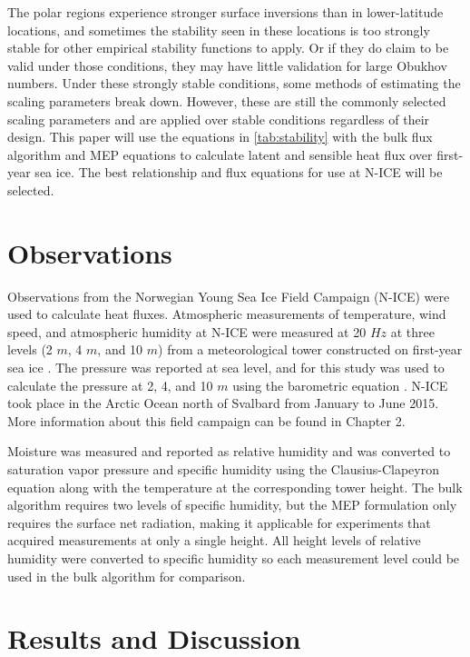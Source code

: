 The polar regions experience stronger surface inversions than in lower-latitude locations, and sometimes the stability seen in these locations is too strongly stable for other empirical stability functions to apply. Or if they do claim to be valid under those conditions, they may have little validation for large Obukhov numbers. Under these strongly stable conditions, some methods of estimating the scaling parameters break down. However, these are still the commonly selected scaling parameters and are applied over stable conditions regardless of their design. This paper will use the equations in \ref{tab:stability} with the bulk flux algorithm and MEP equations to calculate latent and sensible heat flux over first-year sea ice. The best relationship and flux equations for use at N-ICE will be selected. 

\section{Observations}
Observations from the Norwegian Young Sea Ice Field Campaign (N-ICE) were used to calculate heat fluxes. Atmospheric measurements of temperature, wind speed, and atmospheric humidity at N-ICE were measured at 20 $Hz$ at three levels (2 $m$, 4 $m$, and 10 $m$) from a meteorological tower constructed on first-year sea ice \citep{walden:2017}. The pressure was reported at sea level, and for this study was used to calculate the pressure at 2, 4, and 10 $m$ using the barometric equation \citep{lente:2020}. N-ICE took place in the Arctic Ocean north of Svalbard from January to June 2015. More information about this field campaign can be found in Chapter 2.
 
 Moisture was measured and reported as relative humidity and was converted to saturation vapor pressure and specific humidity using the Clausius-Clapeyron equation \citep{iribarne:1981} along with the temperature at the corresponding tower height. The bulk algorithm requires two levels of specific humidity, but the MEP formulation only requires the surface net radiation, making it applicable for experiments that acquired measurements at only a single height. All height levels of relative humidity were converted to specific humidity so each measurement level could be used in the bulk algorithm for comparison. 

\section{Results and Discussion}
